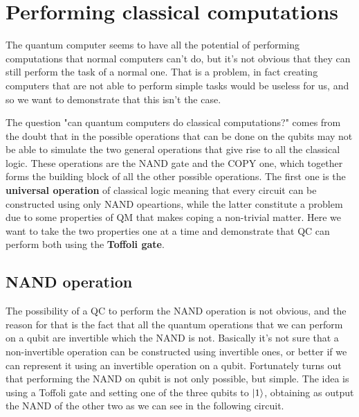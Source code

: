 \section{Performing classical computations}

The quantum computer seems to have all the potential of performing computations that normal computers can't do, but it's not obvious that they can still perform the task of a normal one. That is a problem, in fact creating computers that are not able to perform simple tasks would be useless for us, and so we want to demonstrate that this isn't the case. 

The question "can quantum computers do classical computations?" comes from the doubt that in the possible operations that can be done on the qubits may not be able to simulate the two general operations that give rise to all the classical logic. These operations are the NAND gate and the COPY one, which together forms the building block of all the other possible operations. The first one is the \textbf{universal operation} of classical logic meaning that every circuit can be constructed using only NAND opeartions, while the latter constitute a problem due to some properties of QM that makes coping a non-trivial matter. Here we want to take the two properties one at a time and demonstrate that QC can perform both using the \textbf{Toffoli gate}.

\subsection{NAND operation}

The possibility of a QC to perform the NAND operation is not obvious, and the reason for that is the fact that all the quantum operations that we can perform on a qubit are invertible which the NAND is not. Basically it's not sure that a non-invertible operation can be constructed using invertible ones, or better if we can represent it using an invertible operation on a qubit. Fortunately turns out that performing the NAND on qubit is not only possible, but simple. The idea is using a Toffoli gate and setting one of the three qubits to $\ket{1}$, obtaining as output the NAND of the other two as we can see in the following circuit.

